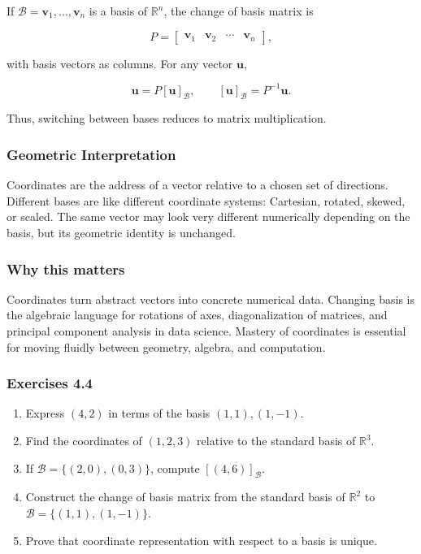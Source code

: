 \documentclass[
  12pt,
  a4paper,
]{article}
\begin{document}
If \(\mathcal{B} = {\mathbf{v}_1, \dots, \mathbf{v}_n}\) is a basis of
\(\mathbb{R}^n\), the change of basis matrix is

\[P = \begin{bmatrix} \mathbf{v}_1 & \mathbf{v}_2 & \cdots & \mathbf{v}_n \end{bmatrix},\]

with basis vectors as columns. For any vector \(\mathbf{u}\),

\[\mathbf{u} = P[\mathbf{u}]_{\mathcal{B}}, \qquad [\mathbf{u}]_{\mathcal{B}} = P^{-1}\mathbf{u}.\]

Thus, switching between bases reduces to matrix multiplication.

\subsubsection{Geometric
Interpretation}\label{geometric-interpretation-7}

Coordinates are the address of a vector relative to a chosen set of
directions. Different bases are like different coordinate systems:
Cartesian, rotated, skewed, or scaled. The same vector may look very
different numerically depending on the basis, but its geometric identity
is unchanged.

\subsubsection{Why this matters}\label{why-this-matters-15}

Coordinates turn abstract vectors into concrete numerical data. Changing
basis is the algebraic language for rotations of axes, diagonalization
of matrices, and principal component analysis in data science. Mastery
of coordinates is essential for moving fluidly between geometry,
algebra, and computation.

\subsubsection{Exercises 4.4}\label{exercises-44}

\begin{enumerate}
\def\labelenumi{\arabic{enumi}.}
\item
  Express \((4,2)\) in terms of the basis \((1,1), (1,-1)\).
\item
  Find the coordinates of \((1,2,3)\) relative to the standard basis of
  \(\mathbb{R}^3\).
\item
  If \(\mathcal{B} = \{(2,0), (0,3)\}\), compute
  \([ (4,6) ]_{\mathcal{B}}\).
\item
  Construct the change of basis matrix from the standard basis of
  \(\mathbb{R}^2\) to \(\mathcal{B} = \{(1,1), (1,-1)\}\).
\item
  Prove that coordinate representation with respect to a basis is
  unique.
\end{enumerate}
\end{document}
